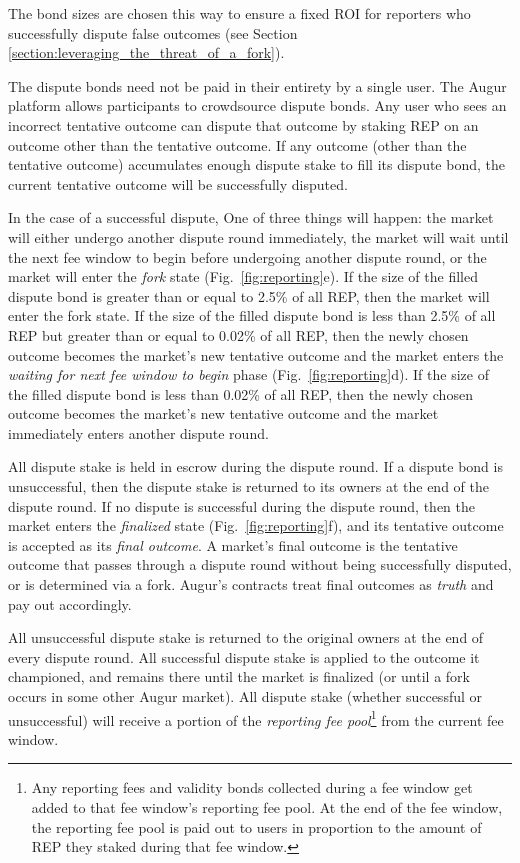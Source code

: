 \documentclass[floatfix,reprint,nofootinbib,amsmath,amssymb,epsfig,pre,floats,letterpaper,groupedaffiliation]{revtex4-1}
\theoremstyle{definition}
\theoremstyle{definition}
\begin{document}
The bond sizes are chosen this way to ensure a fixed ROI for reporters who successfully dispute false outcomes (see Section \ref{section:leveraging_the_threat_of_a_fork}).

The dispute bonds need not be paid in their entirety by a single user.  The Augur platform allows participants to crowdsource dispute bonds.  Any user who sees an incorrect tentative outcome can dispute that outcome by staking REP on an outcome other than the tentative outcome. If any outcome (other than the tentative outcome) accumulates enough dispute stake to fill its dispute bond, the current tentative outcome will be successfully disputed.

In the case of a successful dispute, One of three things will happen: the market will either undergo another dispute round immediately, the market will wait until the next fee window to begin before undergoing another dispute round, or the market will enter the \textit{fork} state (Fig.~\ref{fig:reporting}e).  If the size of the filled dispute bond is greater than or equal to 2.5\% of all REP, then the market will enter the fork state. If the size of the filled dispute bond is less than 2.5\% of all REP but greater than or equal to 0.02\% of all REP, then the newly chosen outcome becomes the market's new tentative outcome and the market enters the \textit{waiting for next fee window to begin} phase (Fig.~\ref{fig:reporting}d). If the size of the filled dispute bond is less than 0.02\% of all REP, then the newly chosen outcome becomes the market's new tentative outcome and the market immediately enters another dispute round.

All dispute stake is held in escrow during the dispute round. If a dispute bond is unsuccessful, then the dispute stake is returned to its owners at the end of the dispute round. If no dispute is successful during the dispute round, then the market enters the \textit{finalized} state (Fig.~\ref{fig:reporting}f), and its tentative outcome is accepted as its \textit{final outcome}.  A market's final outcome is the tentative outcome that passes through a dispute round without being successfully disputed, or is determined via a fork.  Augur's contracts treat final outcomes as \textit{truth} and pay out accordingly.

All unsuccessful dispute stake is returned to the original owners at the end of every dispute round.  All successful dispute stake is applied to the outcome it championed, and remains there until the market is finalized (or until a fork occurs in some other Augur market).  All dispute stake (whether successful or unsuccessful) will receive a portion of the \textit{reporting fee pool}\footnote{Any reporting fees and validity bonds collected during a fee window get added to that fee window's reporting fee pool.  At the end of the fee window, the reporting fee pool is paid out to users in proportion to the amount of REP they staked during that fee window.} from the current fee window.
\end{document}
